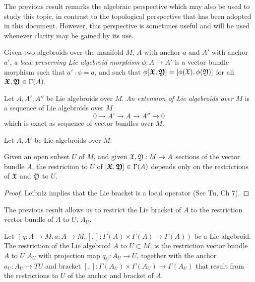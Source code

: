 The previous result remarks the algebraic perspective which may also be used to study this topic, in contrast to the topological perspective that has been adopted in this document. However, this perspective is sometimes useful and will be used whenever clarity may be gained by its use.


\begin{definition}  
Given two algebroids over the manifold $M$, $A$ with anchor $a$ and $A'$ with anchor $a'$, \emph{a base preserving Lie algebroid morphism} $\phi: A \to A'$ is a vector bundle morphism such that $a' \comp \phi = a $, and such that $\phi[\sect{\oid X}, \sect{\oid Y}] = [\phi(\oid X), \phi(\oid Y)]$ for all $\bm{\mathfrak{X}}, \bm{\mathfrak{Y}} \in \Gamma(A)$. 
\end{definition}

\begin{definition} 
Let $A, A', A''$ be Lie algebroids over $M$. \emph{An extension of Lie algebroids over $M$} is a sequence of Lie algebroids over $M$ \[ 0 \to A' \to A \to A'' \to 0 \] which is exact as sequence of vector bundles over $M$.
\end{definition}

\linea

\begin{definition}
Let $A, A'$ be Lie algebroids over $M$. 
\end{definition}

\begin{proposition}
Given an open subset $U$ of $M$, and given $\mathfrak{X}, \mathfrak{Y} : M \to A$ sections of the vector bundle $A$, the restriction to $U$ of $[\bm{\mathfrak{X}}, \bm{\mathfrak{Y}}] \in \Gamma(A)$ depends only on the restrictions of $\mathfrak{X}$ and $\mathfrak{Y}$ to $U$.
\end{proposition}
\begin{proof}
Leibniz implies that the Lie bracket is a local operator (See Tu, Ch 7).
\end{proof}

The previous result allows us to restrict the Lie bracket of $A$ to the restriction vector bundle of $A$ to $U$, $A_U$.

\begin{definition}
Let $(q:A \to M, a: A \to M, [,]:\Gamma(A)\times \Gamma(A) \to \Gamma(A))$ be a Lie algebroid. The restriction of the Lie algebroid $A$ to $U \subset M$, is the restriction vector bundle $A$ to $U$ $A_U$ with projection map $q_U: A_U \to U$, together with the anchor $a_U:A_U \to TU$ and bracket $[,]:\Gamma(A_U)\times \Gamma(A_U) \to \Gamma(A_U)$ that result from the restrictions to $U$ of the anchor and bracket of $A$.
\end{definition}

